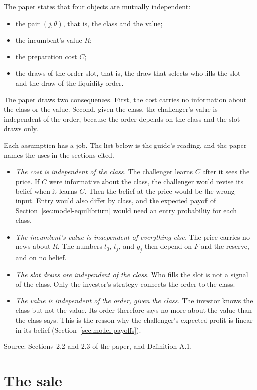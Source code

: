 The paper states that four objects are mutually independent:
\begin{itemize}
\item the pair \((j,\theta)\), that is, the class and the value;
\item the incumbent's value \(R\);
\item the preparation cost \(C\);
\item the draws of the order slot, that is, the draw that selects who fills the slot and the draw of the liquidity order.
\end{itemize}
The paper draws two consequences.
First, the cost carries no information about the class or the value.
Second, given the class, the challenger's value is independent of the order, because the order depends on the class and the slot draws only.

Each assumption has a job. The list below is the guide's reading, and the paper names the uses in the sections cited.
\begin{itemize}
\item \emph{The cost is independent of the class.} The challenger learns \(C\) after it sees the price. If \(C\) were informative about the class, the challenger would revise its belief when it learns \(C\). Then the belief at the price would be the wrong input. Entry would also differ by class, and the expected payoff of Section~\ref{sec:model-equilibrium} would need an entry probability for each class.
\item \emph{The incumbent's value is independent of everything else.} The price carries no news about \(R\). The numbers \(t_0\), \(t_j\), and \(g_j\) then depend on \(F\) and the reserve, and on no belief.
\item \emph{The slot draws are independent of the class.} Who fills the slot is not a signal of the class. Only the investor's strategy connects the order to the class.
\item \emph{The value is independent of the order, given the class.} The investor knows the class but not the value. Its order therefore says no more about the value than the class says. This is the reason why the challenger's expected profit is linear in its belief (Section~\ref{sec:model-payoffs}).
\end{itemize}

{\small\color{notegrey}Source: Sections~2.2 and 2.3 of the paper, and Definition A.1.}

\section{The sale}\label{sec:model-sale}

